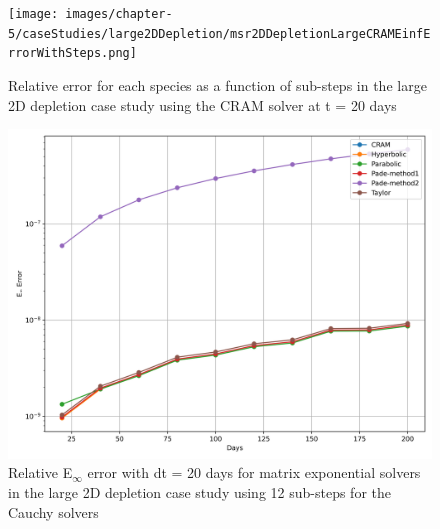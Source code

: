 \clearpage

\begin{landscape}
\thispagestyle{mylandscape}
\begin{figure}[p]
    \centering
    \texttt{[image: images/chapter-5/caseStudies/large2DDepletion/msr2DDepletionLargeCRAMEinfErrorWithSteps.png]}
    \caption{Relative error for each species as a function of sub-steps in the large 2D depletion case study using the CRAM solver at t = 20 days}
    \label{fig:large_2D_depletion_Einf_species_with_substeps}
\end{figure}
\end{landscape}

\clearpage

\begin{figure}[p]
    \centering
    \includegraphics[width=5in]{images/chapter-5/caseStudies/large2DDepletion/msrLarge2DDepletionEinfErrorerrorSteps12.png}
    \caption{Relative E$_{\infty}$ error with dt = 20 days for matrix exponential solvers in the large 2D depletion case study using 12 sub-steps for the Cauchy solvers}
    \label{fig:large_2D_depletion_Einf_steps12}
\end{figure}

\clearpage

